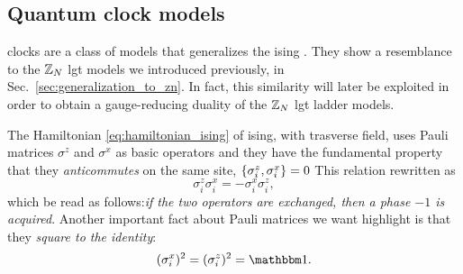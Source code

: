\subsection{Quantum clock models}%
\label{sub:clock_models}

\Acp{clock} are a class of models that generalizes the \ac{ising} \cite{fendley2014parafermions, baxter1989clock}.
They show a resemblance to the $\mathbb{Z}_N$ \ac{lgt} models we introduced previously, in Sec.~\ref{sec:generalization_to_zn}.
In fact, this similarity will later be exploited in order to obtain a gauge-reducing duality of the $\mathbb{Z}_N$ \ac{lgt} ladder models.

The Hamiltonian \eqref{eq:hamiltonian_ising}  of \ac{ising}, with trasverse field, uses Pauli matrices $\sigma^z$ and $\sigma^x$ as basic operators and they have the fundamental property that they \emph{anticommutes} on the same site, $\acomm{\sigma^z_i}{\sigma^x_i} = 0$
This relation rewritten as
\begin{equation}
    \sigma^z_i \sigma^x_i = - \sigma^x_i \sigma^z_i,
    \label{eq:anticommutation_Pauli_matrices}
\end{equation}
which be read as follows:\emph{if the two operators are exchanged, then a phase $-1$ is acquired}.
Another important fact about Pauli matrices we want highlight is that they \emph{square to the identity}:
\begin{equation}
    (\sigma^x_i)^2 = (\sigma^z_i)^2 = \identity.
    \label{eq:identity_Pauli_matrices}
\end{equation}

